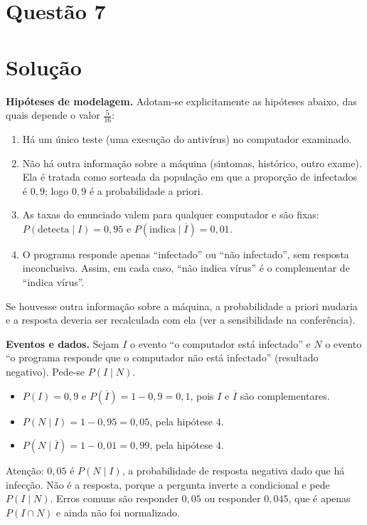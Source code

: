 \documentclass{article}%
\begin{document}
\section*{Questão 7}

\section*{Solução}

\textbf{Hipóteses de modelagem.} Adotam-se explicitamente as hipóteses abaixo, das quais depende o valor $\frac{5}{16}$:
\begin{enumerate}
\item Há um único teste (uma execução do antivírus) no computador examinado.
\item Não há outra informação sobre a máquina (sintomas, histórico, outro exame). Ela é tratada como sorteada da população em que a proporção de infectados é $0{,}9$; logo $0{,}9$ é a probabilidade a priori.
\item As taxas do enunciado valem para qualquer computador e são fixas: $P(\text{detecta}\mid I)=0{,}95$ e $P(\text{indica}\mid \overline{I})=0{,}01$.
\item O programa responde apenas ``infectado'' ou ``não infectado'', sem resposta inconclusiva. Assim, em cada caso, ``não indica vírus'' é o complementar de ``indica vírus''.
\end{enumerate}
Se houvesse outra informação sobre a máquina, a probabilidade a priori mudaria e a resposta deveria ser recalculada com ela (ver a sensibilidade na conferência).

\textbf{Eventos e dados.} Sejam $I$ o evento ``o computador está infectado'' e $N$ o evento ``o programa responde que o computador não está infectado'' (resultado negativo). Pede-se $P(I\mid N)$.
\begin{itemize}
\item $P(I)=0{,}9$ e $P(\overline{I})=1-0{,}9=0{,}1$, pois $I$ e $\overline{I}$ são complementares.
\item $P(N\mid I)=1-0{,}95=0{,}05$, pela hipótese 4.
\item $P(N\mid \overline{I})=1-0{,}01=0{,}99$, pela hipótese 4.
\end{itemize}
Atenção: $0{,}05$ é $P(N\mid I)$, a probabilidade de resposta negativa dado que há infecção. Não é a resposta, porque a pergunta inverte a condicional e pede $P(I\mid N)$. Erros comuns são responder $0{,}05$ ou responder $0{,}045$, que é apenas $P(I\cap N)$ e ainda não foi normalizado.
\end{document}
